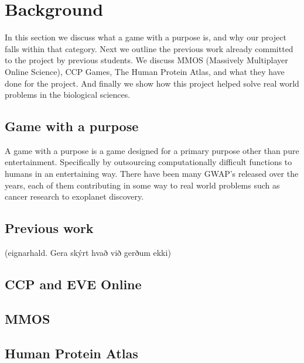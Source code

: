 \section{Background}\label{sec:background}
	In this section we discuss what a game with a purpose is, and why our project falls within that category.
	Next we outline the previous work already committed to the project by previous students.
	We discuss MMOS (Massively Multiplayer Online Science), CCP Games, The Human Protein Atlas, and what they have done for the project. And finally we show how this project helped solve real world problems in the biological sciences.

\subsection{Game with a purpose}
	A game with a purpose is a game designed for a primary purpose other than pure entertainment. Specifically by outsourcing computationally difficult functions to humans in an entertaining way. There have been many GWAP's released over the years, each of them contributing in some way to real world problems such as cancer research to exoplanet discovery.

\subsection{Previous work}
(eignarhald. Gera skýrt hvað við gerðum ekki)

\subsection{CCP and EVE Online}

\subsection{MMOS}

\subsection{Human Protein Atlas}
